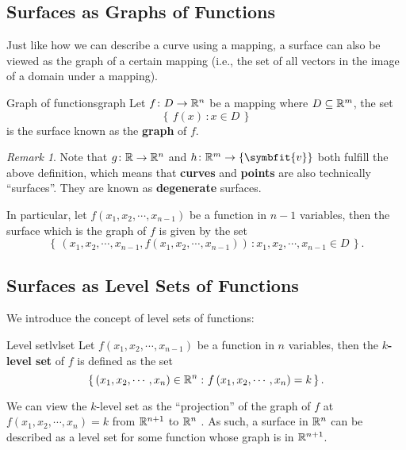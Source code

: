 \documentclass[math]{amznotes}
\theoremstyle{remark}
\newtheorem*{remark}{Remark}
\begin{document}
\subsection{Surfaces as Graphs of Functions}
Just like how we can describe a curve using a mapping, a surface can also be viewed as the graph of a certain mapping (i.e., the set of all vectors in the image of a domain under a mapping).
\begin{dfnbox}{Graph of functions}{graph}
    Let $f \colon D \to \mathbb{R}^n$ be a mapping where $D\subseteq \mathbb{R}^m$, the set
    \begin{displaymath}
        \left\{ \, f(x) \,\colon x \in D \, \right\}
    \end{displaymath}
    is the surface known as the {\color{red} \textbf{graph}} of $f$.
\end{dfnbox}
\begin{notebox}
    \begin{remark}
        Note that $g \colon \mathbb{R} \to \mathbb{R}^n$ and $h \colon \R^m \to \{\symbfit{v}\}$ both fulfill the above definition, which means that {\color{red} \textbf{curves}} and {\color{red} \textbf{points}} are also technically ``surfaces''. They are known as {\color{red} \textbf{degenerate}} surfaces.
    \end{remark}
\end{notebox}
In particular, let $f(x_1, x_2, \cdots, x_{n - 1})$ be a function in $n - 1$ variables, then the surface which is the graph of $f$ is given by the set
\begin{displaymath}
    \left\{ \, \left(x_1, x_2, \cdots, x_{n - 1}, f\left(x_1, x_2, \cdots, x_{n - 1}\right)\right) \,\colon x_1, x_2, \cdots, x_{n - 1} \in D \, \right\}.
\end{displaymath}
\subsection{Surfaces as Level Sets of Functions}
We introduce the concept of level sets of functions:
\begin{dfnbox}{Level set}{lvlset}
    Let $f\left(x_1, x_2, \cdots, x_{n - 1}\right)$ be a function in $n$ variables, then the {\color{red} \textbf{$k$-level set}} of $f$ is defined as the set
    \begin{displaymath}
        \left\{ \, \left(x_1, x_2, \cdots, x_n\right) \in \mathbb{R}^n \,\colon f\left(x_1, x_2, \cdots, x_n\right) = k \, \right\}.
    \end{displaymath}
\end{dfnbox}
We can view the $k$-level set as the ``projection'' of the graph of $f$ at $f(x_1, x_2, \cdots, x_n) = k$ from $\mathbb{R}^{n + 1}$ to $\mathbb{R}^n$ . As such, a surface in $\mathbb{R}^n$ can be described as a level set for some function whose graph is in $\mathbb{R}^{n + 1}$.
\end{document}
